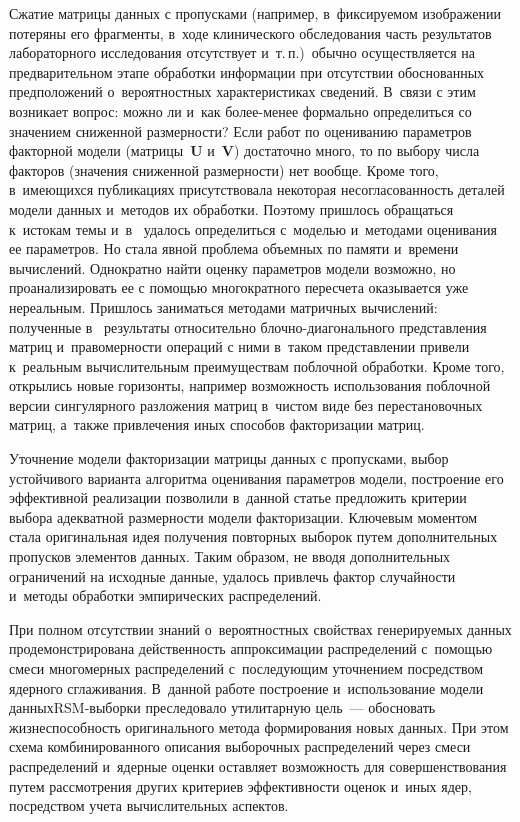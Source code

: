 \begin{multicols}{2}
     Сжатие матрицы данных с пропусками (например, в~фиксируемом 
изображении потеряны его фрагменты, в~ходе клинического обследования 
часть результатов лабораторного исследования отсутствует и~т.\,п.)\ обычно 
осуществляется на предварительном этапе обработки информации при 
отсутствии обоснованных предположений о~вероятностных характеристиках 
сведений. В~связи с этим возникает вопрос: можно ли и~как бо\-лее-ме\-нее 
формально определиться со значением сниженной размерности? Если работ по 
оцениванию па\-ра\-мет\-ров факторной модели (матрицы~$\mathbf{U}$ 
и~$\mathbf{V}$) достаточно много, то по выбору числа факторов (значения 
сниженной размерности) нет вообще. Кроме того, в~имеющихся публикациях 
присутствовала некоторая несогласованность деталей модели данных и~методов 
их обработки. Поэтому пришлось обращаться к~истокам темы и~в~\cite{2-kri} 
удалось определиться с~моделью и~методами оценивания ее па\-ра\-мет\-ров. Но 
стала явной проб\-ле\-ма объемных по памяти и~времени вычислений. Однократно 
найти оценку па\-ра\-мет\-ров модели возможно, но проанализировать ее с 
помощью многократного пересчета оказывается уже нереальным. Пришлось 
заниматься методами мат\-рич\-ных вы\-чис\-ле\-ний: полученные в~\cite{3-kri} 
результаты относительно  
блоч\-но-диа\-го\-наль\-но\-го пред\-став\-ле\-ния мат\-риц и~пра\-во\-мер\-ности 
операций с ними в~таком представлении привели к~реальным вы\-чис\-ли\-тел\-ьным 
преимуществам по\-блоч\-ной обработки. Кроме того, открылись новые 
горизонты, например воз\-мож\-ность использования по\-блоч\-ной версии 
сингулярного разложения мат\-риц в~чис\-том виде без перестановочных мат\-риц, 
а~также привлечения иных способов факторизации мат\-риц.
     
     Уточнение модели факторизации матрицы данных с пропусками, выбор 
устойчивого варианта алгоритма оценивания параметров модели, по\-стро\-ение 
его эффективной реализации позволили в~\mbox{данной} статье предложить критерии 
выбора адекватной размерности модели факторизации. Ключевым моментом 
стала оригинальная идея получения повторных выборок путем дополнительных 
пропусков элементов данных. Таким образом, не вводя дополнительных 
ограничений на исходные данные, удалось привлечь фактор случайности 
и~методы обработки эмпирических распределений.
     
     При полном отсутствии знаний о~вероятностных свойствах ге\-не\-ри\-ру\-емых 
данных продемонстрирована дей\-ст\-вен\-ность ап\-прок\-си\-ма\-ции распределений 
с~по\-мощью смеси многомерных \mbox{распределений} с~по\-сле\-ду\-ющим уточнением 
посредством ядерного сглаживания. В~данной работе построение 
и~использование модели данных\linebreak RSM-вы\-бор\-ки преследовало утилитарную 
цель~--- обосновать жиз\-не\-спо\-соб\-ность оригинального метода формирования 
новых данных. При этом \mbox{схема} комбинированного описания выборочных 
распределений через смеси распределений и~ядерные оценки остав\-ля\-ет 
воз\-мож\-ность для совершенствования путем рас\-смот\-ре\-ния других критериев 
эф\-фек\-тив\-ности оценок и~иных ядер, посредством учета вы\-чис\-ли\-тель\-ных 
аспектов. 
     

\end{multicols}
